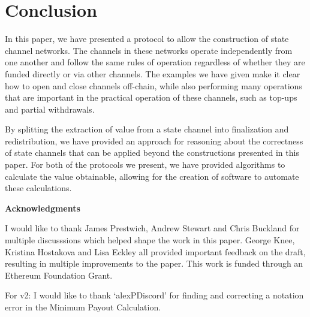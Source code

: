 \section{Conclusion}

In this paper, we have presented a protocol to allow the construction of state channel networks.
The channels in these networks operate independently from one another and follow the same rules of operation regardless of whether they are funded directly or via other channels.
The examples we have given make it clear how to open and close channels off-chain, while also performing many operations that are important in the practical operation of these channels, such as top-ups and partial withdrawals.

By splitting the extraction of value from a state channel into finalization and redistribution, we have provided an approach for reasoning about the correctness of state channels that can be applied beyond the constructions presented in this paper.
For both of the protocols we present, we have provided algorithms to calculate the value obtainable, allowing for the creation of software to automate these calculations.



\textbf{Acknowledgments}

I would like to thank James Prestwich, Andrew Stewart and Chris Buckland for multiple discusssions which helped shape the work in this paper. 
George Knee, Kristina Hostakova and Lisa Eckley all provided important feedback on the draft, resulting in multiple improvements to the paper.
This work is funded through an Ethereum Foundation Grant.

For v2: I would like to thank `alexPDiscord' for finding and correcting a notation error in the Minimum Payout Calculation.
